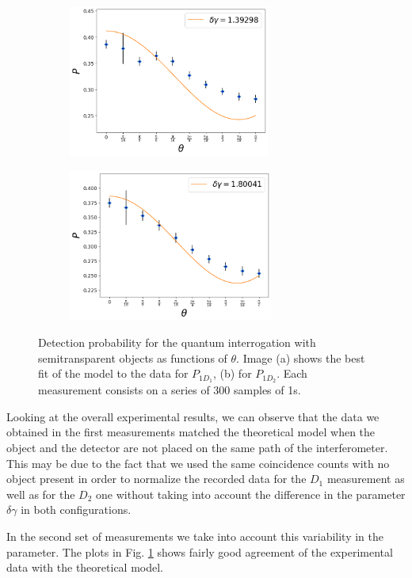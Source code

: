 \documentclass[12pt]{book}
\begin{document}
\begin{figure}[t!]
\centering
\begin{subfigure}[b]{0.45\linewidth}
\includegraphics[width=\linewidth,height=5cm]{images/ajuste_jueves_11_50:50.png}
\caption{}
\end{subfigure}
\begin{subfigure}[b]{0.45\linewidth}
\includegraphics[width=\linewidth,height=5cm]{images/ajuste_jueves_21_50:50.png}
\caption{}
\end{subfigure}
\caption{Detection probability for the quantum interrogation with semitransparent objects as functions of $\theta$. Image (a) shows the best fit of the model to the data for $P_{1D_{1}}$, (b) for $P_{1D_{2}}$. Each measurement consists on a series of 300 samples of 1s.}
\label{segundass}
\end{figure}


Looking at the overall experimental results, we can observe that the data we obtained in the first measurements matched the theoretical model when the object and the detector are not placed on the same path of the interferometer.  This may be due to the fact that we used the same coincidence counts with no object present in order to normalize the recorded data for the $D_{1}$ measurement as well as for the $D_{2}$ one without taking into account the difference in the parameter $\delta\gamma$ in both configurations. 

In the second set of measurements we take into account this variability in the parameter. The plots in Fig. \ref{segundass} shows fairly good agreement of the experimental data with the theoretical model.
\end{document}
